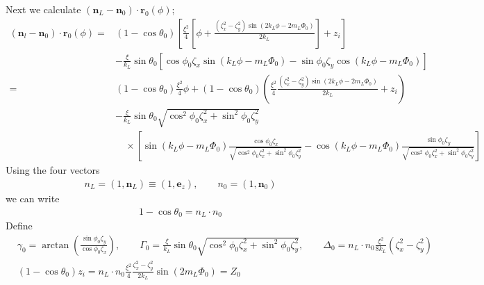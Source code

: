 Next we calculate $({\bm n}_L-{\bm n}_0)\cdot{\bm r}_0(\phi)$;
\begin{align}
    ({\bm n}_l-{\bm n}_0)\cdot{\bm r}_0(\phi)= & (1-\cos\theta_0)
    \left[\frac{\xi^2}4\left[\phi+\frac{(\zeta_x^2-\zeta_y^2)\sin(2k_L\phi-2m_L\varPhi_0)}{2k_L}\right] +z_i        \right]\nonumber                                                                                                                                                    \\
                                               & -\frac{\xi}{k_L}\sin\theta_0\left[\cos\phi_0\zeta_x\sin(k_L\phi-m_L\varPhi_0)-\sin\phi_0\zeta_y\cos(k_L\phi-m_L\varPhi_0)\right]\nonumber                                                                                              \\
    =                                          & (1-\cos\theta_0)\frac{\xi^2}4\phi+(1-\cos\theta_0)
    \left(\frac{\xi^2}4\frac{(\zeta_x^2-\zeta_y^2)\sin(2k_L\phi-2m_L\varPhi_0)}{2k_L} +z_i       \right)\nonumber                                                                                                                                                                       \\
                                               & -\frac{\xi}{k_L}\sin\theta_0\sqrt{\cos^2\phi_0\zeta_x^2+\sin^2\phi_0\zeta_y^2}\nonumber                                                                                                                                                \\
                                               & \quad \times\left[\sin(k_L\phi-m_L\varPhi_0)\frac{\cos\phi_0\zeta_x}{\sqrt{\cos^2\phi_0\zeta_x^2+\sin^2\phi_0\zeta_y^2}}-\cos(k_L\phi-m_L\varPhi_0)\frac{\sin\phi_0\zeta_y}{\sqrt{\cos^2\phi_0\zeta_x^2+\sin^2\phi_0\zeta_y^2}}\right]
\end{align}
Using the four vectors
\begin{align}
    n_L=(1,{\bm n}_L)\equiv(1,{\bm e}_z),\qquad n_0=(1,{\bm n}_0)
\end{align}
we can write
\begin{align}
    1-\cos\theta_0=n_L\cdot n_0
\end{align}
Define
\begin{align}
     & \gamma_0=\arctan\left(\frac{\sin\phi_0\zeta_y}{\cos\phi_0\zeta_x}\right),\qquad \Gamma_0=\frac{\xi}{k_L}\sin\theta_0\sqrt{\cos^2\phi_0\zeta_x^2+\sin^2\phi_0\zeta_y^2},\qquad \Delta_0 = n_L\cdot n_0\frac{\xi^2}{8k_L}(\zeta_x^2-\zeta_y^2)\nonumber \\
     & (1-\cos\theta_0)z_i = n_L\cdot n_0 \frac{\xi^2}4\frac{\zeta_x^2-\zeta_y^2}{2k_L}\sin(2m_L\varPhi_0)=Z_0
\end{align}
